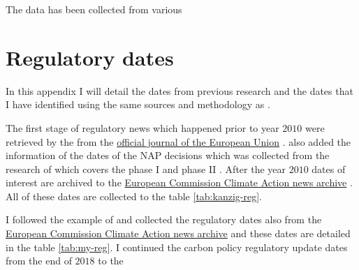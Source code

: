 \documentclass[
]{article}
\begin{document}
The data has been collected from various

\newpage

\hypertarget{regdates}{%
\section{Regulatory dates}\label{regdates}}

In this appendix I will detail the dates from previous research and the dates that I have identified using the same sources and methodology as \citet{kaenzig2022}.

The first stage of regulatory news which happened prior to year \(2010\) were retrieved by \citeauthor{kaenzig2022} the from the \href{https://eur-lex.europa.eu/homepage.html}{official journal of the European Union} \citep{kaenzig2022}. \citeauthor{kaenzig2022} also added the information of the dates of the NAP decisions which was collected from the research of \citet{mansanet2009impacts} which covers the phase I and phase II \citep[\citet{mansanet2009impacts}]{kaenzig2022}. After the year \(2010\) dates of interest are archived to the \href{https://ec.europa.eu/clima/news/news_archives_en}{European Commission Climate Action news archive} \citep{kaenzig2022}. All of these dates are collected to the table \ref{tab:kanzig-reg}.

I followed the example of \citet{kaenzig2022} and collected the regulatory dates also from the \href{https://ec.europa.eu/clima/news/news_archives_en}{European Commission Climate Action news archive} and these dates are detailed in the table \ref{tab:my-reg}. I continued the carbon policy regulatory update dates from the end of \(2018\) to the

\begingroup
\singlespacing

\begingroup\fontsize{10}{12}\selectfont
\end{document}
